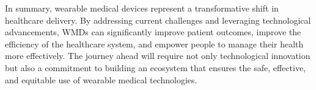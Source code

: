 \documentclass[journal]{IEEEtran}
\begin{document}
In summary, wearable medical devices represent a transformative shift in healthcare delivery. By addressing current challenges and leveraging technological advancements, WMDs can significantly improve patient outcomes, improve the efficiency of the healthcare system, and empower people to manage their health more effectively. The journey ahead will require not only technological innovation but also a commitment to building an ecosystem that ensures the safe, effective, and equitable use of wearable medical technologies.





%





\end{document}
